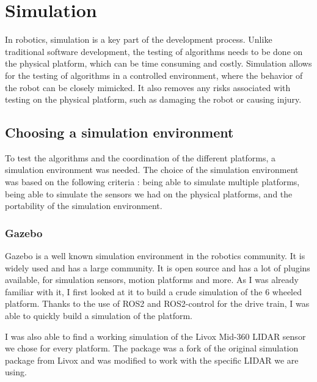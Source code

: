 \documentclass[11pt]{article}
\begin{document}
    
\newpage
\section{Simulation}

    In robotics, simulation is a key part of the development process. Unlike traditional software development, the testing of algorithms needs to be done on the physical platform, which can be time consuming and costly. Simulation allows for the testing of algorithms in a controlled environment, where the behavior of the robot can be closely mimicked. It also removes any risks associated with testing on the physical platform, such as damaging the robot or causing injury. 

    \subsection{Choosing a simulation environment}

        To test the algorithms and the coordination of the different platforms, a simulation environment was needed. The choice of the simulation environment was based on the following criteria : being able to simulate multiple platforms, being able to simulate the sensors we had on the physical platforms, and the portability of the simulation environment.


        \subsubsection{Gazebo}
            Gazebo is a well known simulation environment in the robotics community. It is widely used and has a large community. It is open source and has a lot of plugins available, for simulation sensors, motion platforms and more. As I was already familiar with it, I first looked at it to build a crude simulation of the 6 wheeled platform. Thanks to the use of ROS2 and ROS2-control for the drive train, I was able to quickly build a simulation of the platform. 

            I was also able to find a working simulation of the Livox Mid-360 LIDAR sensor we chose for every platform. The package \cite{livox_lidar_simulation_fork} was a fork of the original simulation package from Livox \cite{livox_laser_simulation} and was modified to work with the specific LIDAR we are using.
            
            
\end{document}
